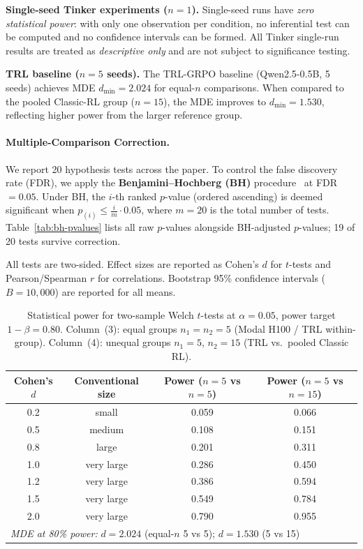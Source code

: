\documentclass{article}
\begin{document}
\textbf{Single-seed Tinker experiments ($n = 1$).}
Single-seed runs have \emph{zero statistical power}: with only one observation per
condition, no inferential test can be computed and no confidence intervals can be
formed.  All Tinker single-run results are treated as \emph{descriptive only} and
are not subject to significance testing.

\textbf{TRL baseline ($n = 5$ seeds).}
The TRL-GRPO baseline (Qwen2.5-0.5B, 5 seeds) achieves MDE
$d_{\min} = 2.024$ for equal-$n$ comparisons.
When compared to the pooled Classic-RL group ($n = 15$), the MDE
improves to $d_{\min} = 1.530$,
reflecting higher power from the larger reference group.

\paragraph{Multiple-Comparison Correction.}
We report 20 hypothesis tests across the paper.
To control the false discovery rate (FDR), we apply the
\textbf{Benjamini--Hochberg (BH)} procedure~\cite{benjamini1995controlling}
at FDR $= 0.05$.  Under BH, the $i$-th ranked $p$-value (ordered ascending)
is deemed significant when $p_{(i)} \le \frac{i}{m} \cdot 0.05$,
where $m = 20$ is the total number of tests.
Table~\ref{tab:bh-pvalues} lists all raw $p$-values alongside BH-adjusted
$p$-values; 19 of 20 tests
survive correction.

All tests are two-sided.  Effect sizes are reported as Cohen's $d$ for
$t$-tests and Pearson/Spearman $r$ for correlations.  Bootstrap 95\%
confidence intervals ($B = 10{,}000$) are reported for all means.

\begin{table}[!ht]
\centering
\caption{Statistical power for two-sample Welch $t$-tests at $\alpha = 0.05$,
         power target $1{-}\beta = 0.80$.
         Column~(3): equal groups $n_1 = n_2 = 5$ (Modal H100 / TRL within-group).
         Column~(4): unequal groups $n_1 = 5$, $n_2 = 15$ (TRL vs.\ pooled Classic RL).}
\label{tab:power-analysis}
\small
\begin{tabular}{@{}cccc@{}}
\toprule
Cohen's $d$ & Conventional size & Power ($n{=}5$ vs $n{=}5$) & Power ($n{=}5$ vs $n{=}15$) \\
\midrule
        0.2 & small & 0.059 & 0.066 \\
        0.5 & medium & 0.108 & 0.151 \\
        0.8 & large & 0.201 & 0.311 \\
        1.0 & very large & 0.286 & 0.450 \\
        1.2 & very large & 0.386 & 0.594 \\
        1.5 & very large & 0.549 & 0.784 \\
        2.0 & very large & 0.790 & 0.955 \\
\midrule
\multicolumn{4}{l}{\textit{MDE at 80\% power:} $d = 2.024$ (equal-$n$ 5 vs 5);\; $d = 1.530$ (5 vs 15)} \\
\bottomrule
\end{tabular}
\end{table}
\end{document}
